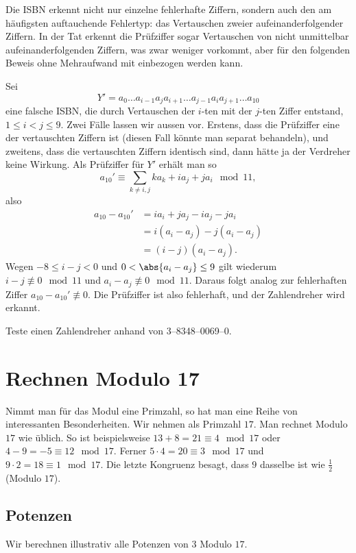 \documentclass[%
11pt,%
twoside,%
titlepage,%
german,%
headsepline%
]{scrartcl}
\begin{document}
Die
ISBN erkennt nicht nur einzelne fehlerhafte Ziffern, sondern auch den am häufigsten auftauchende Fehlertyp: das Vertauschen zweier aufeinanderfolgender Ziffern. In der Tat erkennt die Prüfziffer sogar Vertauschen von nicht unmittelbar aufeinanderfolgenden Ziffern, was zwar weniger vorkommt, aber für den folgenden Beweis ohne Mehraufwand mit einbezogen werden kann.

Sei
$$Y'=a_0\dots a_{i-1}a_ja_{i+1}\dots a_{j-1}a_ia_{j+1}\dots a_{10}$$
eine falsche ISBN, die durch Vertauschen der $i$-ten mit der $j$-ten Ziffer entstand, $1\leq i<j\leq9$. Zwei Fälle lassen wir aussen vor. Erstens, dass die Prüfziffer eine der vertauschten Ziffern ist (diesen Fall könnte man separat behandeln), und zweitens, dass die vertauschten Ziffern identisch sind, dann hätte ja der Verdreher keine Wirkung. Als Prüfziffer für $Y'$ erhält man so
$$a_{10}'\equiv\sum_{k\neq i,j}ka_k+ia_j+ja_i\mod11,$$
also
\begin{align*}
a_{10}-a_{10}'&=ia_i+ja_j-ia_j-ja_i\\
&=i(a_i-a_j)-j(a_i-a_j)\\
&=(i-j)(a_i-a_j).
\end{align*}
Wegen $-8\leq i-j<0$ und $0<\abs{a_i-a_j}\leq9$ gilt wiederum $i-j\not\equiv0\mod11$ und $a_i-a_j\not\equiv0\mod11$. Daraus folgt analog zur fehlerhaften Ziffer $a_{10}-a_{10}'\not\equiv0$. Die Prüfziffer ist also fehlerhaft, und der Zahlendreher wird erkannt.

\begin{ueb}[Zahlendreher]
Teste einen Zahlendreher anhand von 3--8348--0069--0.
\end{ueb}

\clearpage

\clearpage

\section{Rechnen Modulo 17}

Nimmt
man für das Modul eine Primzahl, so hat man eine Reihe von interessanten Besonderheiten. Wir nehmen als Primzahl $17$. Man rechnet Modulo $17$ wie üblich. So ist beispielsweise $13+8=21\equiv 4\mod 17$ oder $4-9=-5\equiv12\mod17$. Ferner $5\cdot4=20\equiv3\mod17$ und $9\cdot 2=18\equiv1\mod17$. Die letzte Kongruenz besagt, dass $9$ dasselbe ist wie $\frac{1}{2}$ (Modulo $17$).

\subsection{Potenzen}
Wir berechnen illustrativ alle Potenzen von $3$ Modulo $17$.
\end{document}
